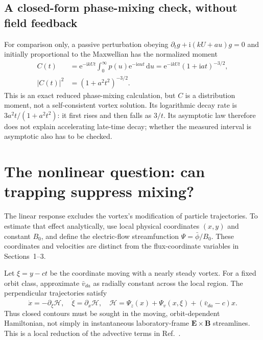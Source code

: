 \documentclass[10pt,a4paper]{article}
\newcommand{\dd}{\mathrm{d}}
\newcommand{\ii}{\mathrm{i}}
\newcommand{\E}{\mathrm{e}}
\newcommand{\Ham}{\mathcal{H}}
\newcommand{\phibar}{\bar\phi}
\newcommand{\vd}{\bar v_{da}}
\begin{document}
\subsection{A closed-form phase-mixing check, without field feedback}
For comparison only, a passive perturbation obeying $\partial_tg+\ii(kU+au)g=0$ and initially proportional to the Maxwellian has the normalized moment
\begin{equation}
 \begin{aligned}
 C(t)&=\E^{-\ii kUt}\int_0^\infty p(u)\E^{-\ii aut}\,\dd u
 =\E^{-\ii kUt}(1+\ii at)^{-3/2},\\
 |C(t)|^2&=(1+a^2t^2)^{-3/2}.
 \end{aligned}\label{eq:passive}
\end{equation}
This is an exact reduced phase-mixing calculation, but $C$ is a distribution moment, not a self-consistent vortex solution. Its logarithmic decay rate is $3a^2t/(1+a^2t^2)$: it first rises and then falls as $3/t$. Its asymptotic law therefore does not explain accelerating late-time decay; whether the measured interval is asymptotic also has to be checked.

\newpage
\section{The nonlinear question: can trapping suppress mixing?}
The linear response excludes the vortex's modification of particle trajectories. To estimate that effect analytically, use local physical coordinates $(x,y)$ and constant $B_0$, and define the electric-flow streamfunction $\Psi=\phibar/B_0$. These coordinates and velocities are distinct from the flux-coordinate variables in Sections~1--3.

Let $\xi=y-ct$ be the coordinate moving with a nearly steady vortex. For a fixed orbit class, approximate $\vd$ as radially constant across the local region. The perpendicular trajectories satisfy
\begin{equation}
 \dot x=-\partial_\xi\Ham,\quad
 \dot\xi=\partial_x\Ham,\quad
 \Ham=\Psi_z(x)+\Psi_v(x,\xi)+(\vd-c)x.
 \label{eq:hamiltonian}
\end{equation}
Thus closed contours must be sought in the moving, orbit-dependent Hamiltonian, not simply in instantaneous laboratory-frame $\mathbf E\times\mathbf B$ streamlines. This is a local reduction of the advective terms in Ref.~\cite{draft}.
\end{document}
